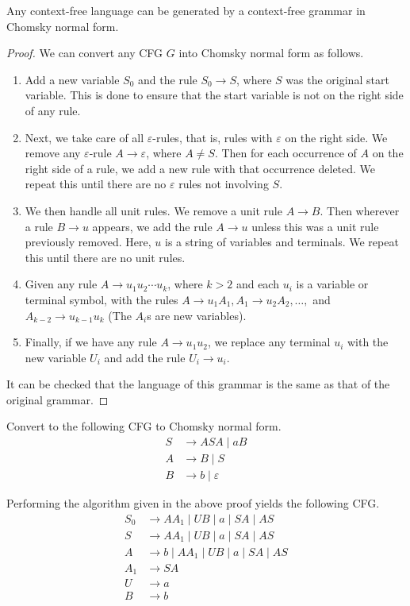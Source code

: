 \begin{theorem}
Any context-free language can be generated by a context-free grammar in Chomsky normal form.
\end{theorem}
\begin{proof}
We can convert any CFG $G$ into Chomsky normal form as follows.

\begin{enumerate}
    \item Add a new variable $S_0$ and the rule $S_0\to S$, where $S$ was the original start variable. This is done to ensure that the start variable is not on the right side of any rule.
    \item Next, we take care of all $\varepsilon$-rules, that is, rules with $\varepsilon$ on the right side. We remove any $\varepsilon$-rule $A\to\varepsilon$, where $A\neq S$. Then for each occurrence of $A$ on the right side of a rule, we add a new rule with that occurrence deleted. We repeat this until there are no $\varepsilon$ rules not involving $S$.
    \item We then handle all unit rules. We remove a unit rule $A\to B$. Then wherever a rule $B\to u$ appears, we add the rule $A\to u$ unless this was a unit rule previously removed. Here, $u$ is a string of variables and terminals. We repeat this until there are no unit rules.
    \item Given any rule $A\to u_1u_2\cdots u_k$, where $k>2$ and each $u_i$ is a variable or terminal symbol, with the rules $A\to u_1A_1, A_1\to u_2A_2, \ldots,$ and $A_{k-2}\to u_{k-1}u_k$ (The $A_i$s  are new variables).
    \item Finally, if we have any rule $A\to u_1u_2$, we replace any terminal $u_i$ with the new variable $U_i$ and add the rule $U_i\to u_i$.
\end{enumerate}

It can be checked that the language of this grammar is the same as that of the original grammar.
\end{proof}

\begin{exercise}
Convert to the following CFG to Chomsky normal form.
\begin{align*}
    S&\to ASA\mid aB \\
    A&\to B\mid S \\
    B&\to b\mid\varepsilon
\end{align*}
\end{exercise}
\begin{solution}
Performing the algorithm given in the above proof yields the following CFG.
\begin{align*}
    S_0&\to AA_1\mid UB\mid a\mid SA\mid AS \\
    S&\to AA_1\mid UB\mid a\mid SA\mid AS \\
    A&\to b\mid AA_1\mid UB\mid a\mid SA\mid AS \\
    A_1&\to SA \\
    U&\to a \\
    B&\to b \\
\end{align*}
\end{solution}
\clearpage

